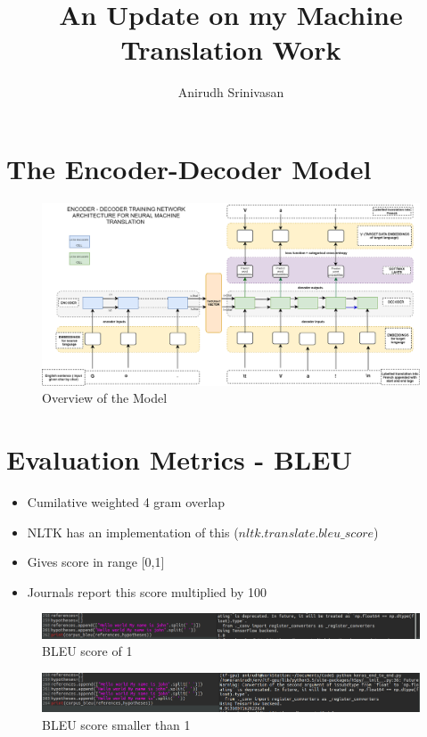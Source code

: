 \documentclass[11pt]{article}
\begin{document}
\title{An Update on my Machine Translation Work}
\author{Anirudh Srinivasan}
\maketitle
\section{The Encoder-Decoder Model}
\begin{figure}[H]
	\includegraphics[scale=0.23]{seq2seq.png}
	\caption{Overview of the Model}
\end{figure}

\section{Evaluation Metrics - BLEU}
\begin{itemize}
	\item Cumilative weighted 4 gram overlap
	\item NLTK has an implementation of this ($nltk.translate.bleu\_score$)
	\item Gives score in range [0,1]
	\item Journals report this score multiplied by 100
\end{itemize}

\begin{figure}[H]
	\includegraphics[scale=0.3,trim={0 0 21cm 0},clip]{Screenshot_from_2018-04-02_09-13-25.png}
	\caption{BLEU score of 1}
\end{figure}
\begin{figure}[H]
	\includegraphics[scale=0.3,trim={0 0 20cm 0},clip]{Screenshot_from_2018-04-02_09-12-17.png}
	\caption{BLEU score smaller than 1}
\end{figure}
\end{document}
